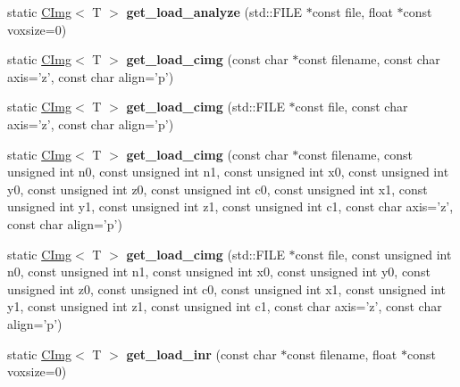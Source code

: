 \begin{DoxyCompactItemize}
\item 
\hypertarget{structcimg__library_1_1CImg_a25dbfed63a7c2ec112973e84faef84fc}{
static \hyperlink{structcimg__library_1_1CImg}{CImg}$<$ T $>$ {\bfseries get\_\-load\_\-analyze} (std::FILE $\ast$const file, float $\ast$const voxsize=0)}
\label{structcimg__library_1_1CImg_a25dbfed63a7c2ec112973e84faef84fc}

\item 
\hypertarget{structcimg__library_1_1CImg_acf34dea4ff73b03e04e53b178bbaa91b}{
static \hyperlink{structcimg__library_1_1CImg}{CImg}$<$ T $>$ {\bfseries get\_\-load\_\-cimg} (const char $\ast$const filename, const char axis='z', const char align='p')}
\label{structcimg__library_1_1CImg_acf34dea4ff73b03e04e53b178bbaa91b}

\item 
\hypertarget{structcimg__library_1_1CImg_a6e4749ff04b027e25e633a18ee21d82b}{
static \hyperlink{structcimg__library_1_1CImg}{CImg}$<$ T $>$ {\bfseries get\_\-load\_\-cimg} (std::FILE $\ast$const file, const char axis='z', const char align='p')}
\label{structcimg__library_1_1CImg_a6e4749ff04b027e25e633a18ee21d82b}

\item 
\hypertarget{structcimg__library_1_1CImg_abe1df4aac48b22448197e92736e450f8}{
static \hyperlink{structcimg__library_1_1CImg}{CImg}$<$ T $>$ {\bfseries get\_\-load\_\-cimg} (const char $\ast$const filename, const unsigned int n0, const unsigned int n1, const unsigned int x0, const unsigned int y0, const unsigned int z0, const unsigned int c0, const unsigned int x1, const unsigned int y1, const unsigned int z1, const unsigned int c1, const char axis='z', const char align='p')}
\label{structcimg__library_1_1CImg_abe1df4aac48b22448197e92736e450f8}

\item 
\hypertarget{structcimg__library_1_1CImg_a70bd85ad5aa1d2df56dedd52b07cfd27}{
static \hyperlink{structcimg__library_1_1CImg}{CImg}$<$ T $>$ {\bfseries get\_\-load\_\-cimg} (std::FILE $\ast$const file, const unsigned int n0, const unsigned int n1, const unsigned int x0, const unsigned int y0, const unsigned int z0, const unsigned int c0, const unsigned int x1, const unsigned int y1, const unsigned int z1, const unsigned int c1, const char axis='z', const char align='p')}
\label{structcimg__library_1_1CImg_a70bd85ad5aa1d2df56dedd52b07cfd27}

\item 
\hypertarget{structcimg__library_1_1CImg_aa2715bb8c3015da25a0aff1cdcd4a772}{
static \hyperlink{structcimg__library_1_1CImg}{CImg}$<$ T $>$ {\bfseries get\_\-load\_\-inr} (const char $\ast$const filename, float $\ast$const voxsize=0)}
\label{structcimg__library_1_1CImg_aa2715bb8c3015da25a0aff1cdcd4a772}


\end{DoxyCompactItemize}
